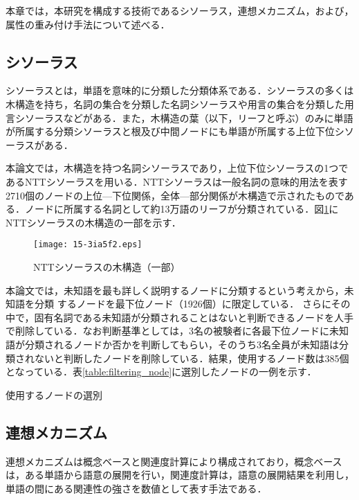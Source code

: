 \documentclass[japanese]{jnlp_1.4}
\begin{document}
本章では，本研究を構成する技術であるシソーラス，連想メカニズム，および，属性の重み付け手法について述べる．

\subsection{シソーラス}\label{thesaurus}

シソーラスとは，単語を意味的に分類した分類体系である．シソーラスの多くは木構造を持ち，名詞の集合を分類した名詞シソーラスや用言の集合を分類した用言シソーラスなどがある．また，木構造の葉（以下，リーフと呼ぶ）のみに単語が所属する分類シソーラスと根及び中間ノードにも単語が所属する上位下位シソーラスがある．

本論文では，木構造を持つ名詞シソーラスであり，上位下位シソーラスの1つであるNTTシソーラス\cite{NTT_Thesaurus:97}を用いる．NTTシソーラスは一般名詞の意味的用法を表す2710個のノードの上位—下位関係，全体—部分関係が木構造で示されたものである．ノードに所属する名詞として約13万語のリーフが分類されている．図\ref{fig:thesaurus}にNTTシソーラスの木構造の一部を示す．

\begin{figure}[b]
\begin{center}
\texttt{[image: 15-3ia5f2.eps]}
\end{center}
\caption{NTTシソーラスの木構造（一部）}
\label{fig:thesaurus}
\end{figure}

本論文では，未知語を最も詳しく説明するノードに分類するという考えから，未知語を分類
するノードを最下位ノード（1926個）に限定している．
さらにその中で，固有名詞である未知語が分類されることはないと判断できるノードを人手で削除している．なお判断基準としては，3名の被験者に各最下位ノードに未知語が分類されるノードか否かを判断してもらい，そのうち3名全員が未知語は分類されないと判断したノードを削除している．結果，使用するノード数は385個となっている．表\ref{table:filtering_node}に選別したノードの一例を示す．

\begin{table}[t]
\caption{使用するノードの選別}

\label{table:filtering_node}
\end{table}


\subsection{連想メカニズム}\label{association_mechanism}

連想メカニズムは概念ベースと関連度計算により構成されており，概念ベース\cite{okumura:07}は，ある単語から語意の展開を行い，関連度計算\cite{watabe:06}は，語意の展開結果を利用し，単語の間にある関連性の強さを数値として表す手法である．
\end{document}
